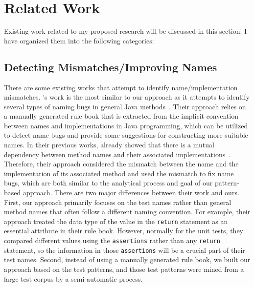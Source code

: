 \section{Related Work}
\label{sec:related-work}



Existing work related to my proposed research will be discussed in this section. I have organized them into the following categories:

\subsection{Detecting Mismatches\slash Improving Names}

There are some existing works that attempt to identify name\slash implementation mismatches.
%
's work is the most similar to our approach as it attempts to identify several types of naming bugs in general Java methods~\cite{host2009debugging}.
%
Their approach relies on a manually generated rule book that is extracted from the implicit convention between names and implementations in Java programming, which can be utilized to detect name bugs and provide some suggestions for constructing more suitable names.
%
In their previous works, \citeauthor{host2008java} already showed that there is a mutual dependency between method names and their associated implementations~\cite{host2008java}.
%
Therefore, their approach considered the mismatch between the name and the implementation of its associated method and used the mismatch to fix name bugs, which are both similar to the analytical process and goal of our pattern-based approach.
%
There are two major differences between their work and ours.
%
First, our approach primarily focuses on the test names rather than general method names that often follow a different naming convention.
%
For example, their approach treated the data type of the value in the \texttt{return} statement as an essential attribute in their rule book.
%
However, normally for the unit tests, they compared different values using the \texttt{assertions} rather than any \texttt{return} statement, so the information in those \texttt{assertions} will be a crucial part of their test names.
%
Second, instead of using a manually generated rule book, we built our approach based on the test patterns, and those test patterns were mined from a large test corpus by a semi-automatic process.


